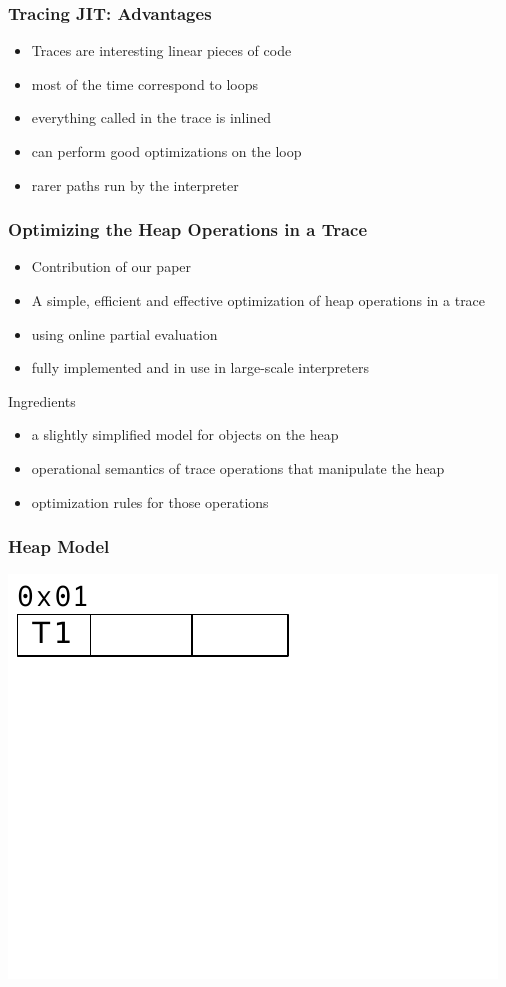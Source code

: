 \documentclass[utf8x]{beamer}
\begin{document}
\begin{frame}
  \frametitle{Tracing JIT: Advantages}
  \begin{itemize}
      \item Traces are interesting linear pieces of code
      \item most of the time correspond to loops
      \item everything called in the trace is inlined
      \item can perform good optimizations on the loop
      \item rarer paths run by the interpreter
  \end{itemize}
\end{frame}

\begin{frame}
  \frametitle{Optimizing the Heap Operations in a Trace}
  \begin{itemize}
      \item Contribution of our paper
      \item A simple, efficient and effective optimization of heap operations in a trace
      \item using online partial evaluation
      \item fully implemented and in use in large-scale interpreters
  \end{itemize}
  \pause
  \begin{block}{Ingredients}
      \begin{itemize}
          \item a slightly simplified model for objects on the heap
          \item operational semantics of trace operations that manipulate the heap
          \item optimization rules for those operations
      \end{itemize}
  \end{block}
\end{frame}

\begin{frame}
  \frametitle{Heap Model}
  \includegraphics[scale=0.9]{figures/heap01}
\end{frame}
\end{document}
